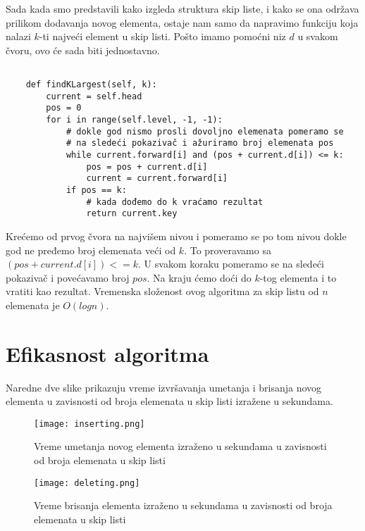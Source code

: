 \documentclass[a4paper]{article}
\begin{document}
Sada kada smo predstavili kako izgleda struktura skip liste, i kako se ona održava prilikom dodavanja novog elementa, ostaje nam samo da napravimo funkciju koja nalazi $k$-ti najveći element u skip listi. Pošto imamo pomoćni niz $d$ u svakom čvoru, ovo će sada biti jednostavno. 

\begin{verbatim}

    def findKLargest(self, k):
        current = self.head
        pos = 0
        for i in range(self.level, -1, -1):
            # dokle god nismo prosli dovoljno elemenata pomeramo se
            # na sledeći pokazivač i ažuriramo broj elemenata pos
            while current.forward[i] and (pos + current.d[i]) <= k:
                pos = pos + current.d[i]
                current = current.forward[i]
            if pos == k:
                # kada dođemo do k vraćamo rezultat
                return current.key

\end{verbatim}

Krećemo od prvog čvora na najvišem nivou i pomeramo se po tom nivou dokle god ne pređemo broj elemenata veći od $k$. To proveravamo sa $(pos + current.d[i]) <= k$. U svakom koraku pomeramo se na sledeći pokazivač i povećavamo broj $pos$. Na kraju ćemo doći do $k$-tog elementa i to vratiti kao rezultat. Vremenska složenost ovog algoritma za skip listu od $n$ elemenata je $O(logn)$. 


\section{Efikasnost algoritma}
\label{sec:efikasnost}

Naredne dve slike prikazuju vreme izvršavanja umetanja i brisanja novog elementa u zavisnosti od broja elemenata u skip listi izražene u sekundama. 


\begin{figure}[h!]
\begin{center}
\texttt{[image: inserting.png]}
\end{center}
\caption{Vreme umetanja novog elementa izraženo u sekundama u zavisnosti od broja elemenata u skip listi}
\label{skiplist}
\end{figure}



\begin{figure}[h!]
\begin{center}
\texttt{[image: deleting.png]}
\end{center}
\caption{Vreme brisanja elementa izraženo u sekundama u zavisnosti od broja elemenata u skip listi}
\label{skiplist}
\end{figure}
\end{document}
